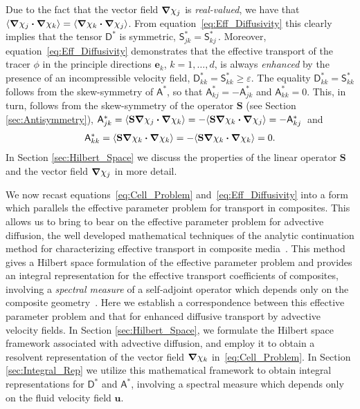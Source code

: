 \documentclass[leqno,onefignum,onetabnum]{siamltex1213}
\newcommand{\Sb}{\mathbf{S}}
\newcommand{\Dm}{\mathsf{D}}
\newcommand{\Sm}{\mathsf{S}}
\newcommand{\Am}{\mathsf{A}}
\newcommand\bnabla{\mbox{\boldmath${\nabla}$}}
\providecommand\bcdot{\boldsymbol{\cdot}}
\newcommand{\vecu}{\boldsymbol{u}}
\newcommand{\vece}{\boldsymbol{e}}
\begin{document}
Due to the fact that the vector field
$\bnabla \chi_j$ is \emph{real-valued}, we have that
$\langle\bnabla \chi_j\bcdot\bnabla \chi_k\rangle=\langle\bnabla \chi_k\bcdot\bnabla \chi_j\rangle$. From
equation~\eqref{eq:Eff_Diffusivity} this clearly implies that the
tensor $\Dm^*$ is symmetric, $\Sm^*_{jk}=\Sm^*_{kj}\,$. Moreover,
equation~\eqref{eq:Eff_Diffusivity} demonstrates that the effective
transport 
of the tracer $\phi$ in the principle directions $\vece _k$, $k=1,\ldots,d$,
is always \emph{enhanced} by the presence of an incompressible velocity
field, $\Dm^*_{kk}=\Sm^*_{kk}\geq\varepsilon$. The equality $\Dm^*_{kk}=\Sm^*_{kk}$
follows from the skew-symmetry of $\Am^*$, so that
$\Am^*_{kj}=-\Am^*_{jk}$ and $\Am^*_{kk}=0$. This, in turn, follows from the
skew-symmetry of the operator $\Sb$ (see Section
\ref{sec:Antisymmetry}),
$\Am^*_{jk}=\langle\Sb\bnabla \chi_j\bcdot\bnabla \chi_k\rangle=-\langle\Sb\bnabla \chi_k\bcdot\bnabla \chi_j\rangle=-\Am^*_{kj}\,$ 
and 
%
\begin{align}\label{eq:Sb_Skew}
  \Am^*_{kk}=\langle\Sb\bnabla \chi_k\bcdot\bnabla \chi_k\rangle=-\langle\Sb\bnabla \chi_k\bcdot\bnabla \chi_k\rangle=0.  
\end{align}
%
In Section \ref{sec:Hilbert_Space} we discuss the properties of the
linear operator $\Sb$ and the vector field $\bnabla \chi_j$ in more detail.





We now recast equations~\eqref{eq:Cell_Problem}
and~\eqref{eq:Eff_Diffusivity} into a form which parallels the
effective 
parameter problem for transport in composites. This allows us to
bring to bear on the effective parameter problem for advective
diffusion, the well developed mathematical techniques of the
analytic continuation method for characterizing effective transport in
composite media~\cite{Golden:CMP-473,MILTON:2002:TC}. This method
gives a Hilbert 
space formulation of the effective parameter problem and provides an
integral representation for the effective transport coefficients of
composites, involving a \emph{spectral measure} of a self-adjoint
operator which depends only on the composite
geometry~\cite{Golden:CMP-473,Murphy:JMP:063506,MILTON:2002:TC}. Here
we 
establish a correspondence between this effective parameter problem
and that for enhanced diffusive transport by advective velocity 
fields. In Section \ref{sec:Hilbert_Space}, we formulate the Hilbert
space framework associated with advective diffusion, and employ it to
obtain a resolvent representation of the vector field $\bnabla \chi_k$
in~\eqref{eq:Cell_Problem}. In Section \ref{sec:Integral_Rep} we
utilize 
this mathematical framework to obtain integral representations for 
$\Dm^*$ and $\Am^*$, involving a spectral measure which depends
only on the fluid velocity field $\vecu $.    
\end{document}
